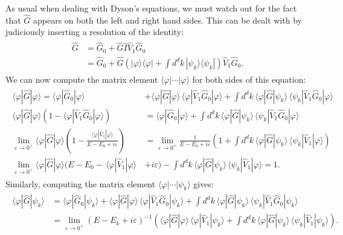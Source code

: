 \documentclass[pra,12pt]{revtex4}
\begin{document}
As usual when dealing with Dyson's equations, we must watch out for
the fact that $\hat{G}$ appears on both the left and right hand sides.
This can be dealt with by judiciously inserting a resolution of the
identity:
\begin{align}
  \begin{aligned}\hat{G} &= \hat{G}_0 + \hat{G} \hat{I} \hat{V}_1 \hat{G}_0 \\ &= \hat{G}_0 + \hat{G} \left(|\varphi\rangle\langle\varphi| + \int d^dk\, |\psi_k\rangle\langle\psi_k|\right) \hat{V}_1 \hat{G}_0. \end{aligned}
\end{align}
We can now compute the matrix element
$\langle\varphi|\cdots|\varphi\rangle$ for both sides of this equation:
\begin{align*}
  \begin{aligned}\langle\varphi|\hat{G}|\varphi\rangle = \langle\varphi|\hat{G}_0|\varphi\rangle &+ \langle\varphi|\hat{G}|\varphi\rangle \, \langle\varphi|\hat{V}_1 \hat{G}_0|\varphi\rangle + \int d^dk\, \langle\varphi|\hat{G}|\psi_k\rangle \, \langle\psi_k| \hat{V}_1 \hat{G}_0|\varphi\rangle \\
\langle\varphi|\hat{G}|\varphi\rangle \left(1 - \langle\varphi|\hat{V}_1 \hat{G}_0|\varphi\rangle\right) &= \langle\varphi|\hat{G}_0|\varphi\rangle + \int d^dk\, \langle\varphi|\hat{G}|\psi_k\rangle \, \langle\psi_k| \hat{V}_1 \hat{G}_0|\varphi\rangle \\ \lim_{\varepsilon\rightarrow0^+}
\langle\varphi|\hat{G}|\varphi\rangle \left(1 - \frac{\langle\varphi|\hat{V}_1|\varphi\rangle}{E - E_0 + i\varepsilon}\right) &= \lim_{\varepsilon\rightarrow0^+} \frac{1}{E  - E_0 + i\varepsilon} \left(1+ \int d^dk\, \langle\varphi|\hat{G}|\psi_k\rangle \, \langle\psi_k| \hat{V}_1|\varphi\rangle \right) \\
\lim_{\varepsilon\rightarrow0^+} \langle\varphi|\hat{G}|\varphi\rangle \Big(E - E_0 -\, \langle\varphi|\hat{V}_1|\varphi\rangle \, & + i\varepsilon\Big) - \int d^dk\, \langle\varphi|\hat{G}|\psi_k\rangle \, \langle\psi_k| \hat{V}_1|\varphi\rangle = 1.\end{aligned}
\end{align*}
Similarly, computing the matrix element
$\langle\varphi|\cdots|\psi_k\rangle$ gives:
\begin{align*}
  \begin{aligned}
\langle\varphi|\hat{G}|\psi_k\rangle &= \langle\varphi|\hat{G}_0|\psi_k\rangle + \langle\varphi|\hat{G}|\varphi\rangle \, \langle\varphi|\hat{V}_1 \hat{G}_0|\psi_k\rangle + \int d^dk\, \langle\varphi|\hat{G}|\psi_k\rangle \, \langle\psi_k| \hat{V}_1 \hat{G}_0|\psi_k\rangle \\
&= \lim_{\varepsilon\rightarrow0^+} \left(E-E_k+i\varepsilon\right)^{-1} \left(\langle\varphi|\hat{G}|\varphi\rangle \, \langle\varphi|\hat{V}_1|\psi_k\rangle + \int d^dk\, \langle\varphi|\hat{G}|\psi_k\rangle \, \langle\psi_k| \hat{V}_1|\psi_k\rangle\right).\end{aligned}
\end{align*}
\end{document}
